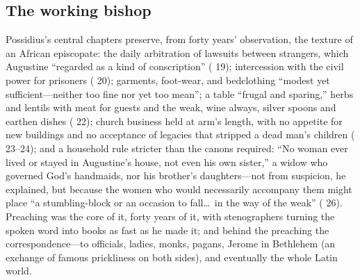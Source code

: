 \subsection{The working bishop}

Possidius's central chapters preserve, from forty years' observation, the
texture of an African episcopate: the daily arbitration of lawsuits between
strangers, which Augustine ``regarded as a kind of conscription''
( 19); intercession with the civil power for prisoners
( 20); garments, foot-wear, and bedclothing ``modest yet
sufficient---neither too fine nor yet too mean''; a table ``frugal and
sparing,'' herbs and lentils with meat for guests and the weak, wine always,
silver spoons and earthen dishes ( 22); church business held at
arm's length, with no appetite for new buildings and no acceptance of
legacies that stripped a dead man's children ( 23--24); and a
household rule stricter than the canons required: ``No woman ever lived or
stayed in Augustine's house, not even his own sister,'' a widow who governed
God's handmaids, nor his brother's daughters---not from suspicion, he
explained, but because the women who would necessarily accompany them
might place ``a stumbling-block or an occasion to fall\ldots\ in the way of
the weak'' ( 26). Preaching was the core of it, forty years of
it, with stenographers turning the spoken word into books as fast as he
made it; and behind the preaching the correspondence---to officials,
ladies, monks, pagans, Jerome in Bethlehem (an exchange of famous
prickliness on both sides), and eventually the whole Latin world.

